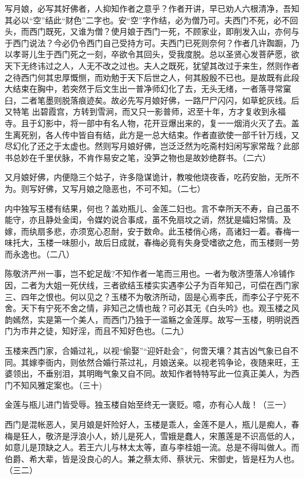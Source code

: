 \begin{showcontents}{}
{写月娘，必写其好佛者，人抑知作者之意乎？作者开讲，早已劝人六根清净，吾知其必以“空”结此“财色”二字也。安“空”字作结，必为僧乃可。夫西门不死，必不回头，而西门既死，又谁为僧？使月娘于西门一死，不顾家业，即削发入山，亦何与于西门说法？今必仍令西门自己受持方可。夫西门已死则奈何？作者几许踟蹰，乃以孝哥儿生于西门死之一刻，卒欲令其回头，受我度脱。总以圣贤心发菩萨愿，欲天下无终讳过之人，人无不改之过也。夫人之既死，犹望其改过于来生，然则作者之待西门何其忠厚慨恻，而劝勉于天下后世之人，何其殷殷不已也。是故既有此段大结束在胸中，若突然于后文生出一普净师幻化了去，无头无绪，一者落寻常窠臼，二者笔墨则脱落痕迹矣。故必先写月娘好佛，一路尸尸闪闪，如草蛇灰线。后又特笔
出碧霞宫，方转到雪涧，而又只一影普师，迟至十年，方才复收到永福寺。且于幻影中，将一部中有名人物，花开豆爆出来的，复一一烟消火灭了去。盖生离死别，各人传中皆自有结，此方是一总大结束。作者直欲使一部千针万线，又尽幻化了还之于太虚也。然则写月娘好佛，岂泛泛然为吃斋村妇闲写家常哉？此部书总妙在千里伏脉，不肯作易安之笔，没笋之物也是故妙绝群书。（二六）

又月娘好佛，内便隐三个姑子，许多隐谋诡计，教唆他烧夜香，吃药安胎，无所不为。则写好佛，又写月娘之隐恶也，不可不知。（二七）

内中独写玉楼有结果，何也？盖劝瓶儿、金莲二妇也。言不幸所天不寿，自己虽不能守，亦且静处金闺，令媒妁说合事成，虽不免扇坟之诮，然犹是孀妇常情。及嫁，而纨扇多悲，亦须宽心忍耐，安于数命。此玉楼俏心疡，高诸妇一着。春梅一味托大，玉楼一味胆小，故后日成就，春梅必竟有失身受嗜欲之危，而玉楼则一劳而永逸也。（二八）

陈敬济严州一事，岂不蛇足哉?不知作者一笔而三用也。一者为敬济堕落人冷铺作因，二者为大姐一死伏线，三者欲结玉楼实实遇李公子为百年知己，可偿在西门家三、四年之恨也。何以见之？玉楼不为敬济所动，固是心焉李氏，而李公子宁死不舍。天下有宁死不舍之情，非知己之情也哉？可必其无《白头吟》也。观玉楼之风韵嫣然，实是第一个美人，而西门乃独于一滥觞之金莲厚。故写一玉楼，明明说西门为市井之徒，知好淫，而且不知好色也。（二九）

玉楼来西门家，合婚过礼，以视“偷娶”“迎奸赴会”，何啻天壤？其吉凶气象已自不同。其嫁李衙内，则依然合婚行茶过礼，月娘送亲。以视老鸨争论，夜随来旺，王婆领出，不垂别泪，其明晦气象又自不同。故知作者特特写此一位真正美人，为西门不知风雅定案也。（三十)

金莲与瓶儿进门皆受辱。独玉楼自始至终无一褒贬。噫，亦有心人哉！（三一）

西门是混帐恶人，吴月娘是奸险好人，玉楼是乖人，金莲不是人，瓶儿是痴人，春梅是狂人，敬济是浮浪小人，娇儿是死人，雪娥是蠢人，宋蕙莲是不识高低的人，如意儿是顶缺之人。若王六儿与林太太等，直与李桂姐一流。总是不得叫做人。而伯爵、希大辈，皆是没良心的人。兼之蔡太师、蔡状元、宋御史，皆是枉为人也。（三二）

}
\end{showcontents}
